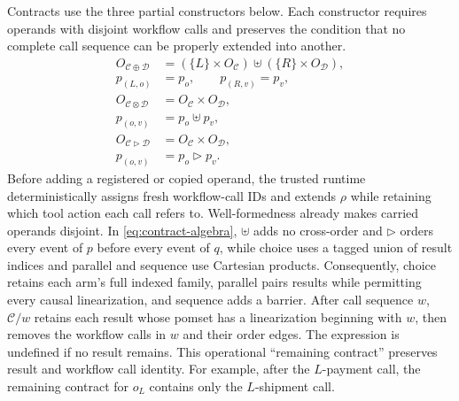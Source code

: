 Contracts use the three partial constructors below.
Each constructor requires operands with disjoint workflow calls and preserves the condition that no complete call sequence can be properly extended into another.
\begin{equation}
\label{eq:contract-algebra}
\begin{aligned}
 O_{\mathcal C\oplus\mathcal D}
  &= (\{L\}\mathbin{\times}O_{\mathcal C})
     \uplus(\{R\}\mathbin{\times}O_{\mathcal D}),\\
 p_{(L,o)}&=p_o,\qquad p_{(R,v)}=p_v,\\
 O_{\mathcal C\otimes\mathcal D}
  &=O_{\mathcal C}\mathbin{\times}O_{\mathcal D},\\
 p_{(o,v)}&=p_o\uplus p_v,\\
 O_{\mathcal C\triangleright\mathcal D}
  &=O_{\mathcal C}\mathbin{\times}O_{\mathcal D},\\
 p_{(o,v)}&=p_o\triangleright p_v.
\end{aligned}
\end{equation}
Before adding a registered or copied operand, the trusted runtime deterministically assigns fresh workflow-call IDs and extends \(\rho\) while retaining which tool action each call refers to.
Well-formedness already makes carried operands disjoint.
In \cref{eq:contract-algebra}, \(\uplus\) adds no cross-order and \(\triangleright\) orders every event of \(p\) before every event of \(q\), while choice uses a tagged union of result indices and parallel and sequence use Cartesian products.
Consequently, choice retains each arm's full indexed family, parallel pairs results while permitting every causal linearization, and sequence adds a barrier.
After call sequence \(w\), \(\mathcal C/w\) retains each result whose pomset has a linearization beginning with \(w\), then removes the workflow calls in \(w\) and their order edges.
The expression is undefined if no result remains.
This operational ``remaining contract'' preserves result and workflow call identity.
For example, after the \(L\)-payment call, the remaining contract for \(o_L\) contains only the \(L\)-shipment call.

